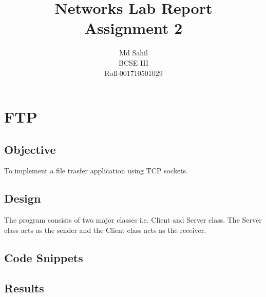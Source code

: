 \documentclass[14pt,titlepage, a4paper]{extarticle}
\title{Networks Lab Report\\Assignment 2}
\author{Md Sahil\\BCSE III\\Roll-001710501029}
\date{}
\begin{document}
{\maketitle}

\section{FTP}

\subsection{Objective}
To implement a file trasfer application using TCP sockets. 

\subsection{Design}
The program consists of two major classes i.e. Client and Server class. 
The Server class acts as the sender and the Client class acts as the receiver.

\subsection{Code Snippets}
\subsection{Results}
\end{document}
